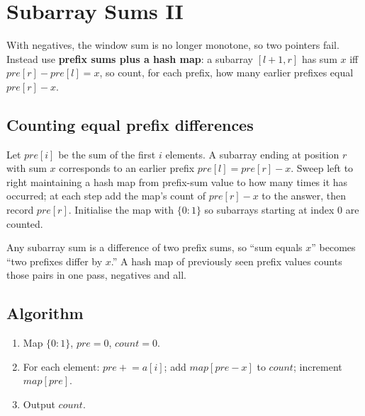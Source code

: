 \section{Subarray Sums II}
\label{sec:cses-subarray-sums-ii}


\begin{patternbox}
With negatives, the window sum is no longer monotone, so two pointers fail.
Instead use \textbf{prefix sums plus a hash map}: a subarray $[l+1,r]$ has
sum $x$ iff $\textit{pre}[r]-\textit{pre}[l]=x$, so count, for each prefix,
how many earlier prefixes equal $\textit{pre}[r]-x$.
\end{patternbox}

\subsection*{Counting equal prefix differences}

Let $\textit{pre}[i]$ be the sum of the first $i$ elements. A subarray
ending at position $r$ with sum $x$ corresponds to an earlier prefix
$\textit{pre}[l]=\textit{pre}[r]-x$. Sweep left to right maintaining a hash
map from prefix-sum value to how many times it has occurred; at each step
add the map's count of $\textit{pre}[r]-x$ to the answer, then record
$\textit{pre}[r]$. Initialise the map with $\{0:1\}$ so subarrays starting
at index $0$ are counted.

\begin{ideabox}
Any subarray sum is a difference of two prefix sums, so ``sum equals $x$''
becomes ``two prefixes differ by $x$.'' A hash map of previously seen prefix
values counts those pairs in one pass, negatives and all.
\end{ideabox}

\subsection*{Algorithm}

\begin{enumerate}
  \item Map $\{0:1\}$, $\textit{pre}=0$, $\textit{count}=0$.
  \item For each element: $\textit{pre}\mathrel{+}=a[i]$; add
        $\textit{map}[\textit{pre}-x]$ to $\textit{count}$; increment
        $\textit{map}[\textit{pre}]$.
  \item Output $\textit{count}$.
\end{enumerate}

